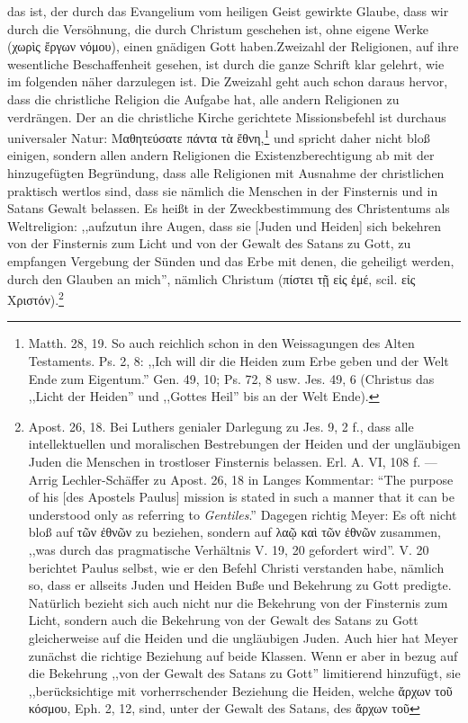das ist, der durch das Evangelium vom heiligen Geist gewirkte Glaube, dass wir durch die Versöhnung, die durch Christum geschehen ist, ohne eigene Werke (χωρὶς ἔργων νόμου), einen gnädigen Gott haben.\n\nDie Zweizahl der Religionen, auf ihre wesentliche Beschaffenheit gesehen, ist durch die ganze Schrift klar gelehrt, wie im folgenden näher darzulegen ist. Die Zweizahl geht auch schon daraus hervor, dass die christliche Religion die Aufgabe hat, alle andern Religionen zu verdrängen. Der an die christliche Kirche gerichtete Missionsbefehl ist durchaus universaler Natur: Μαθητεύσατε πάντα τὰ ἔθνη,\footnote{Matth. 28, 19. So auch reichlich schon in den Weissagungen des Alten Testaments. Ps. 2, 8: ,,Ich will dir die Heiden zum Erbe geben und der Welt Ende zum Eigentum.'' Gen. 49, 10; Ps. 72, 8 usw. Jes. 49, 6 (Christus das ,,Licht der Heiden'' und ,,Gottes Heil'' bis an der Welt Ende).} und spricht daher nicht bloß einigen, sondern allen andern Religionen die Existenzberechtigung ab mit der hinzugefügten Begründung, dass alle Religionen mit Ausnahme der christlichen praktisch wertlos sind, dass sie nämlich die Menschen in der Finsternis und in Satans Gewalt belassen. Es heißt in der Zweckbestimmung des Christentums als Weltreligion: ,,aufzutun ihre Augen, dass sie [Juden und Heiden] sich bekehren von der Finsternis zum Licht und von der Gewalt des Satans zu Gott, zu empfangen Vergebung der Sünden und das Erbe mit denen, die geheiligt werden, durch den Glauben an mich'', nämlich Christum (πίστει τῇ εἰς ἐμέ, scil. εἰς Χριστόν).\footnote{Apost. 26, 18. Bei Luthers genialer Darlegung zu Jes. 9, 2 f., dass alle intellektuellen und moralischen Bestrebungen der Heiden und der ungläubigen Juden die Menschen in trostloser Finsternis belassen. Erl. A. VI, 108 f. --- Arrig Lechler-Schäffer zu Apost. 26, 18 in Langes Kommentar: ``The purpose of his [des Apostels Paulus] mission is stated in such a manner that it can be understood only as referring to \emph{Gentiles}.'' Dagegen richtig Meyer: Es oft nicht bloß auf τῶν ἐθνῶν zu beziehen, sondern auf λαῷ καὶ τῶν ἐθνῶν zusammen, ,,was durch das pragmatische Verhältnis V. 19, 20 gefordert wird''. V. 20 berichtet Paulus selbst, wie er den Befehl Christi verstanden habe, nämlich so, dass er allseits Juden und Heiden Buße und Bekehrung zu Gott predigte. Natürlich bezieht sich auch nicht nur die Bekehrung von der Finsternis zum Licht, sondern auch die Bekehrung von der Gewalt des Satans zu Gott gleicherweise auf die Heiden und die ungläubigen Juden. Auch hier hat Meyer zunächst die richtige Beziehung auf beide Klassen. Wenn er aber in bezug auf die Bekehrung ,,von der Gewalt des Satans zu Gott'' limitierend hinzufügt, sie ,,berücksichtige mit vorherrschender Beziehung die Heiden, welche ἄρχων τοῦ κόσμου, Eph. 2, 12, sind, unter der Gewalt des Satans, des ἄρχων τοῦ}